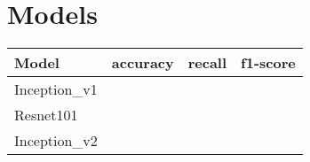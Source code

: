 \section{Models}


\begin{center}
	\begin{tabular}{ l | c | c | r }
		\hline
		\textbf{Model} & \textbf{accuracy} & \textbf{recall} & \textbf{f1-score}  \\ \hline
		Inception\_v1 & & & \\
		Resnet101 & & & \\
		Inception\_v2 & & & \\
		\hline
	\end{tabular}
\end{center}